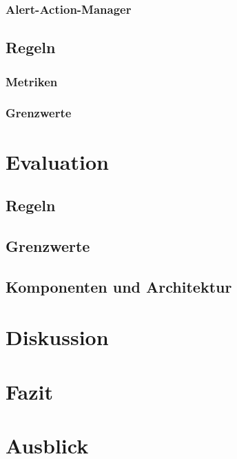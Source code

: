 \documentclass[a4paper,12pt]{scrartcl}
\begin{document}
\subsubsection{Alert-Action-Manager}
\subsection{Regeln}
\subsubsection{Metriken}
\subsubsection{Grenzwerte}

\section{Evaluation}
\subsection{Regeln}
\subsection{Grenzwerte}
\subsection{Komponenten und Architektur}

\section{Diskussion}

\section{Fazit}

\section{Ausblick}
\end{document}
